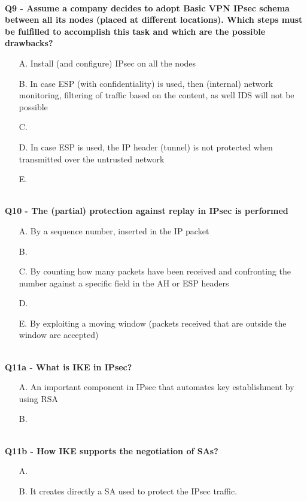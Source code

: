 \textbf{\\Q9 - Assume a company decides to adopt Basic VPN IPsec schema between all its nodes (placed at different locations). 
Which steps must be fulfilled to accomplish this task and which are the possible drawbacks?}
\begin{itemize}
    \item[A.] Install (and configure) IPsec on all the nodes
    \item[B.] In case ESP (with confidentiality) is used, then (internal) network monitoring, filtering of traffic based on the content, as well IDS will not be possible
    \item[C.] 
    \item[D.] In case ESP is used, the IP header (tunnel) is not protected when transmitted over the untrusted network
    \item[E.] 
\end{itemize}

\textbf{\\Q10 - The (partial) protection against replay in IPsec is performed}
\begin{itemize}
    \item[A.] By a sequence number, inserted in the IP packet
    \item[B.] 
    \item[C.] By counting how many packets have been received and confronting the number against a specific field in the AH or ESP headers
    \item[D.] 
    \item[E.] By exploiting a moving window (packets received that are outside the window are accepted)
\end{itemize}

\textbf{\\Q11a - What is IKE in IPsec?}
\begin{itemize}
    \item[A.] An important component in IPsec that automates key establishment by using RSA
    \item[B.] 
\end{itemize}
\textbf{\\Q11b - How IKE supports the negotiation of SAs?}
\begin{itemize}
    \item[A.] 
    \item[B.] It creates directly a SA used to protect the IPsec traffic.
\end{itemize}

